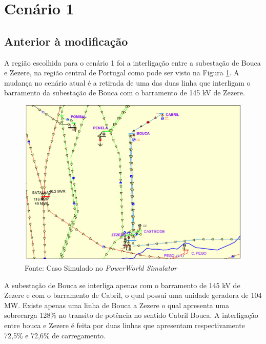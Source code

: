 \section{Cenário 1} %

\subsection{Anterior à modificação}

A região escolhida para o cenário 1 foi a interligação entre a subestação de Bouca e Zezere, na região central de Portugal como pode ser visto na Figura \ref{fig:caso1}. A mudança no cenário atual é a retirada de uma das duas linha que interligam o barramento da subestação de Bouca com o barramento de 145 kV de Zezere.

\vspace{3.3mm}

\begin{figure}[H]
	\centering
	\captionsetup{width=1\textwidth, font=footnotesize, textfont=bf}	
	\includegraphics[width=1\linewidth]{img/caso1.pdf}
	\caption{Cenário 1, anterior à modificação}
	\vspace{-3.5mm}
	\caption*{Fonte: Caso Simulado no \textit{PowerWorld\textsuperscript{\textregistered} Simulator}}
	\label{fig:caso1}
\end{figure}

A subestação de Bouca se interliga apenas com o barramento de 145 kV de Zezere e com o barramento de Cabril, o qual possui uma unidade geradora de 104 MW. Existe apenas uma linha de Bouca a Zezere o qual apresenta uma sobrecarga 128\% no transito de potência no sentido Cabril Bouca. A interligação entre bouca e Zezere é feita por duas linhas que apresentam respectivamente  72,5\% e 72,6\% de carregamento.

